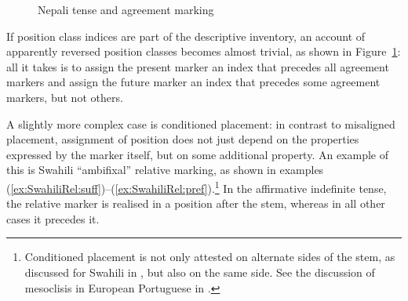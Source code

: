 \documentclass[output=paper
	        ,collection
	        ,collectionchapter
 	        ,biblatex
                ,babelshorthands
                ,newtxmath
                ,draftmode
                ,colorlinks, citecolor=brown
]{langscibook}
\begin{document}
\begin{exe}
\begin{xlist}
\begin{exe}
\begin{xlist}
\begin{figure}[htb]
  \centering
    \caption{Nepali tense and agreement marking}\label{fig:AnalysisNepali}
\end{figure}

If position class indices are part of the descriptive inventory, an
account of apparently reversed position classes \citep{Stump93}
becomes almost trivial, as shown in Figure~\ref{fig:AnalysisNepali}:
all it takes is to assign the present marker an index that precedes
all agreement markers and assign the future marker an index that
precedes some agreement markers, but not others.

A slightly more complex case is conditioned placement: in contrast to
misaligned placement, assignment of position does not just depend on
the properties expressed by the marker itself, but on some additional
property. An example of this is Swahili ``ambifixal'' relative
marking, as shown in examples
(\ref{ex:SwahiliRel:suff})--(\ref{ex:SwahiliRel:pref}).\footnote{Conditioned
  placement is not only attested on alternate sides of the stem, as
  discussed for Swahili in \citet{Stump93}, but also on the same
  side. See the discussion of mesoclisis in European Portuguese in
  \citet{Crysmann:Bonami:2016}.} In the affirmative indefinite tense,
the relative marker is realised in a position after the stem, whereas
in all other cases it precedes it. 


\end{xlist}
\end{exe}
\end{xlist}
\end{exe}
\end{document}
